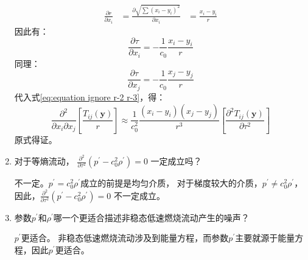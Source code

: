 \begin{enumerate}
\begin{equation}
            \begin{aligned}
                \frac{\partial r}{\partial x_{i}}
                &= \frac{\partial \sqrt{ \sum \left(x_{i}-y_{i}\right)^{2}}}{\partial x_{i}}
                &= \frac{x_{i} - y_{i}}{r}
            \end{aligned}
        \end{equation}
        因此有：
        \begin{equation}
            \frac{\partial \tau}{\partial x_{i}}
            = - \frac{1}{c_{0}} \frac{x_{i} - y_{i}}{r}
        \end{equation}
        同理：
        \begin{equation}
            \frac{\partial \tau}{\partial x_{j}}
            = - \frac{1}{c_{0}} \frac{x_{j} - y_{j}}{r}
        \end{equation}
        代入式\eqref{eq:equation ignore r-2 r-3}，得：
        \begin{equation}
            \frac{\partial^{2}}{\partial x_{i} \partial x_{j}}\left[\frac{T_{i j}(\boldsymbol{y})}{r}\right] 
            \approx \frac{1}{c_{0}^{2}} \frac{\left(x_{i}-y_{i}\right)\left(x_{j}-y_{j}\right)}{r^{3}}\left[\frac{\partial^{2} T_{i j}(\boldsymbol{y})}{\partial \tau^{2}}\right]
        \end{equation}
        原式得证。

    \clearpage

    \item 对于等熵流动，
    \(\frac{\partial^{2}}{\partial \tau^{2}}\left(p^{\prime}-c_{0}^{2} \rho^{\prime}\right)=0\)
    一定成立吗？
    
        不一定。\( p^{\prime} = c_{0}^{2} \rho^{\prime} \)成立的前提是均匀介质，
        对于梯度较大的介质，\( p^{\prime} \neq  c_{0}^{2} \rho^{\prime} \)，
        因此，\(\frac{\partial^{2}}{\partial \tau^{2}}\left(p^{\prime}-c_{0}^{2} \rho^{\prime}\right)=0\) 不一定成立。

        
    \item 参数\(p^{\prime}\)和\(\rho^{\prime}\)哪一个更适合描述非稳态低速燃烧流动产生的噪声？
        
        \(p^{\prime}\)更适合。
        非稳态低速燃烧流动涉及到能量方程，而参数\(p^{\prime}\)主要就源于能量方程，因此\(p^{\prime}\)更适合。
\end{enumerate}